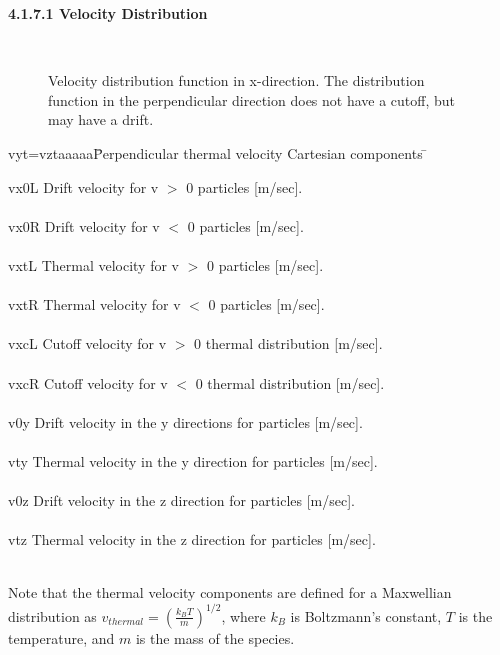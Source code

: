 \begin{section}
\begin{subsection}
\begin{subsubsection}
\begin{tabbing}
\end{tabbing}

\noindent
{\bf 4.1.7.1 Velocity Distribution} \\
%
\begin{figure}
\begin{center}
\leavevmode
\hbox{%
\epsfysize 4.0in
\epsfxsize 4.0in
}
\end{center}
\caption{
Velocity distribution function in x-direction.  The
distribution function in the perpendicular direction does not have a
cutoff, but may have a drift.
}
\label{FOFVX}
\end{figure}
%
\begin{tabbing}
         vyt=vztaaaaa\= Perpendicular thermal velocity Cartesian
components \= \kill

         vx0L \> Drift velocity for v $>$ 0 particles [m/sec]. \> \\
\\ vx0R \> Drift velocity for v $<$ 0 particles [m/sec].  \> \\
\\ vxtL \> Thermal velocity for v $>$ 0 particles [m/sec]. \> \\
\\ vxtR \> Thermal velocity for v $<$ 0 particles [m/sec]. \> \\
\\ vxcL \> Cutoff velocity for v $>$ 0 thermal distribution [m/sec]. \>
\\ 								\\
vxcR \> Cutoff velocity for v $<$ 0 thermal distribution [m/sec]. \> \\
\\ v0y \> Drift velocity in the y directions for particles [m/sec]. \> \\
\\ vty \> Thermal velocity in the y direction for particles [m/sec].  \> \\
\\ v0z \> Drift velocity in the z direction for particles [m/sec]. \> \\
\\ vtz \> Thermal velocity in the z direction for particles [m/sec]. \> \\
\\ 	
\end{tabbing}
Note that the thermal velocity components are defined for a
Maxwellian distribution as 
$v_{thermal} = \left( \frac{k_{B} T}{m} \right)^{1/2}$, 
where $k_{B}$ is Boltzmann's constant, $T$ is the temperature, and
$m$ is the mass of the species.


\end{subsubsection}
\end{subsection}
\end{section}
